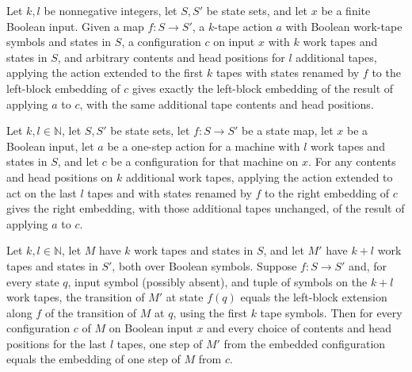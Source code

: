 \begin{lemma}
\label{Turing.FinTM.leftCfg_apply}
\leanok
{}
Let $k,l$ be nonnegative integers, let $S,S'$ be state sets, and let $x$ be a finite
Boolean input. Given a map $f:S\to S'$, a $k$-tape action $a$ with Boolean work-tape
symbols and states in $S$, a configuration $c$ on input $x$ with $k$ work tapes and
states in $S$, and arbitrary contents and head positions for $l$ additional tapes,
applying the action extended to the first $k$ tapes with states renamed by $f$ to the
left-block embedding of $c$ gives exactly the left-block embedding of the result of
applying $a$ to $c$, with the same additional tape contents and head positions.
\end{lemma}

\begin{lemma}
\label{Turing.FinTM.rightCfg_apply}
\leanok
{}
Let $k,l \in \mathbb{N}$, let $S,S'$ be state sets, let $f:S\to S'$ be a state map, let
$x$ be a Boolean input, let $a$ be a one-step action for a machine with $l$ work tapes
and states in $S$, and let $c$ be a configuration for that machine on $x$. For any
contents and head positions on $k$ additional work tapes, applying the action extended
to act on the last $l$ tapes and with states renamed by $f$ to the right embedding of
$c$ gives the right embedding, with those additional tapes unchanged, of the result of
applying $a$ to $c$.
\end{lemma}

\begin{lemma}
\label{Turing.FinTM.leftCfg_step}
\leanok
{}
Let $k,l\in\mathbb N$, let $M$ have $k$ work tapes and states in $S$, and let $M'$ have
$k+l$ work tapes and states in $S'$, both over Boolean symbols. Suppose $f:S\to S'$ and,
for every state $q$, input symbol (possibly absent), and tuple of symbols on the $k+l$
work tapes, the transition of $M'$ at state $f(q)$ equals the left-block extension along
$f$ of the transition of $M$ at $q$, using the first $k$ tape symbols. Then for every
configuration $c$ of $M$ on Boolean input $x$ and every choice of contents and head
positions for the last $l$ tapes, one step of $M'$ from the embedded configuration
equals the embedding of one step of $M$ from $c$.
\end{lemma}

